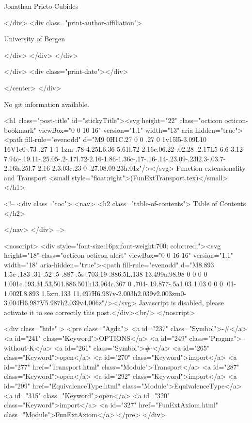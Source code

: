                   Jonathan Prieto-Cubides
                
              </div>
              <div class="print-author-affiliation">
                
                  University of Bergen
                
                </div>
            </div>
          </div>
          
          
        </div>
        <div class="print-date"></div>
        
        
    </center>
  </div>

  
  No git information available.
  

  <h1 class="post-title" id="stickyTitle"><svg height="22" class="octicon octicon-bookmark" viewBox="0 0 10 16" version="1.1" width="13" aria-hidden="true"><path fill-rule="evenodd" d="M9 0H1C.27 0 0 .27 0 1v15l5-3.09L10 16V1c0-.73-.27-1-1-1zm-.78 4.25L6.36 5.61l.72 2.16c.06.22-.02.28-.2.17L5 6.6 3.12 7.94c-.19.11-.25.05-.2-.17l.72-2.16-1.86-1.36c-.17-.16-.14-.23.09-.23l2.3-.03.7-2.16h.25l.7 2.16 2.3.03c.23 0 .27.08.09.23h.01z"/></svg> Function extensionality and Transport <small style="float:right">(FunExtTransport.tex)</small>
  </h1>

  <!-- 
  <div class="toc">
    <nav>
    <h2 class="table-of-contents"> Table of Contents </h2>
      

    </nav>
  </div>
   -->

  <noscript>
  <div style="font-size:16px;font-weight:700; color:red;"><svg height="18" class="octicon octicon-alert" viewBox="0 0 16 16" version="1.1" width="18" aria-hidden="true"><path fill-rule="evenodd" d="M8.893 1.5c-.183-.31-.52-.5-.887-.5s-.703.19-.886.5L.138 13.499a.98.98 0 0 0 0 1.001c.193.31.53.501.886.501h13.964c.367 0 .704-.19.877-.5a1.03 1.03 0 0 0 .01-1.002L8.893 1.5zm.133 11.497H6.987v-2.003h2.039v2.003zm0-3.004H6.987V5.987h2.039v4.006z"/></svg> Javascript is disabled, please activate it to see correctly this post.</div><br/>
  </noscript>

  <div class="hide" >
<pre class="Agda">
<a id="237" class="Symbol">{-#</a> <a id="241" class="Keyword">OPTIONS</a> <a id="249" class="Pragma">--without-K</a> <a id="261" class="Symbol">#-}</a>
<a id="265" class="Keyword">open</a> <a id="270" class="Keyword">import</a> <a id="277" href="Transport.html" class="Module">Transport</a>
<a id="287" class="Keyword">open</a> <a id="292" class="Keyword">import</a> <a id="299" href="EquivalenceType.html" class="Module">EquivalenceType</a>
<a id="315" class="Keyword">open</a> <a id="320" class="Keyword">import</a> <a id="327" href="FunExtAxiom.html" class="Module">FunExtAxiom</a>
</pre>
</div>

